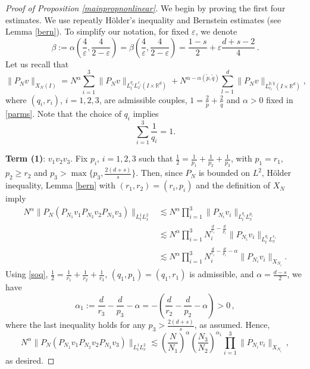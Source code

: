 \documentclass[10pt,leqno]{amsart}
\newcommand{\R}{\mathbb{R}} %
\numberwithin{equation}{section}
\begin{document}
\begin{proof}[Proof of Proposition \ref{mainpropnonlinear}]
We begin by proving the first four estimates. We use repeatly H\" older's inequality and Bernstein estimates (see Lemma \ref{bern}). To simplify our notation, for fixed $\varepsilon$, we
 denote 
$$
\beta := \alpha \left( \frac{4}{\varepsilon}, \frac{4}{2-\varepsilon}\right) =  \beta \left(\frac{4}{\varepsilon}, \frac{4}{2-\varepsilon}\right) = \dfrac{1-s}{2}+\varepsilon \dfrac{d+s-2}{4} \,.
$$
Let us recall that
$$\|P_N v\|_{X_N (I)}= N^\alpha \sum_{i=1}^{3} \|P_N v\|_{L_t^{q_i} L_x^{r_i} (I\times \R^d)} +N^{\alpha-\alpha(\tilde{p},\tilde{q}) } \sum_{l=1}^d \|P_N v \|_{L_{e_l}^{\tilde{p},\tilde{q} } (I\times \R^d)},$$
where $(q_i ,r_i)$, $i=1,2,3$, are admissible couples, $1= \frac{2}{\tilde{p}} +\frac{2}{\tilde{q}}$ and $\alpha>0$ fixed in \eqref{parms}. Note that the choice of $q_i$ implies 
\begin{equation}\label{soq}
\sum_{i=1}^3 \dfrac{1}{q_i}=1. 
\end{equation}



\textbf{Term (1)}: $v_1 v_2 v_3$. 
Fix $p_i$, $i = 1, 2, 3$ such that $\frac{1}{2}=\frac{1}{p_1}+\frac{1}{p_2} +\frac{1}{p_3} $, with $p_1=r_1$, $p_2 \geq r_2$ and $p_3 > \max\{p_3, \frac{2(d + s)}{s} \}$. 
Then, since $P_N$ is bounded on $L^2$, H\" older
inequality,  Lemma \ref{bern} with $(r_1, r_2) = (r_i, p_i)$ and the definition of $X_N$ imply
\begin{align*}
N^\alpha \|P_N (P_{N_1} v_1  P_{N_2} v_2 P_{N_3} v_3) \|_{L_t^{1} L_x^{2}} &\lesssim N^\alpha \prod_{i=1}^3 \|P_{N_i} v_i \|_{L_t^{q_i}L_x^{p_i}} \\
&\lesssim N^\alpha \prod_{i=1}^3 N_i^{\frac{d}{r_i}- \frac{d}{p_i}} \|P_{N_i} v_i \|_{L_t^{q_i}L_x^{r_i}} \\
&\lesssim N^\alpha \prod_{i=1}^3 N_i^{\frac{d}{r_i}- \frac{d}{p_i} -\alpha } \|P_{N_i} v_i\|_{X_{N_i}}  .
\end{align*}
Using \eqref{soq}, $\frac{1}{2} = \frac{1}{r_1} + \frac{1}{r_2} + \frac{1}{r_3}$, $(q_1,p_1) = (q_1, r_1)$ is admissible, and $\alpha =\frac{d-s}{2}$, we have
$$\alpha_1 :=  \frac{d}{ r_3} - \frac{d}{p_3} -\alpha = -\left(\frac{d}{ r_2}- \frac{d}{p_2} -\alpha\right) > 0 \,,$$
where the last inequality holds for any $p_3 > \frac{2(d + s)}{s}$, as  assumed. 
Hence,
$$N^\alpha \|P_N (P_{N_1} v_1  P_{N_2} v_2 P_{N_3} v_3) \|_{L_t^{1} L_x^{2}} \lesssim \left(\frac{N}{N_1}\right)^\alpha \left(\frac{N_3}{N_2}\right)^{\alpha_1} \prod_{i=1}^3 \|P_{N_i} v_i \|_{X_{N_i}} \,,$$
as desired.



\end{proof}
\end{document}
